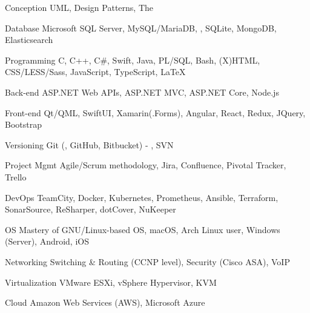 

\begin{cvskills}

  \cvskill
    {Conception} %
    {UML, Design Patterns, The } %

  \cvskill
    {Database} %
    {Microsoft SQL Server, MySQL/MariaDB, , SQLite, MongoDB, Elasticsearch} %

  \cvskill
    {Programming} %
    {C, C++, C\#, Swift, Java, PL/SQL, Bash, (X)HTML, CSS/LESS/Sass, JavaScript, TypeScript, \LaTeX} %

  \cvskill
    {Back-end} %
    {ASP.NET Web APIs, ASP.NET MVC, ASP.NET Core, Node.js} %

  \cvskill
    {Front-end} %
    {Qt/QML, SwiftUI, Xamarin(.Forms), Angular, React, Redux, JQuery, Bootstrap} %

  \cvskill
    {Versioning} %
    {Git (, GitHub, Bitbucket) - , SVN} %

  \cvskill
    {Project Mgmt} %
    {Agile/Scrum methodology, Jira, Confluence, Pivotal Tracker, Trello} %

  \cvskill
    {DevOps} %
    {TeamCity, Docker, Kubernetes, Prometheus, Ansible, Terraform, SonarSource, ReSharper, dotCover, NuKeeper} %

  \cvskill
    {OS} %
    {Mastery of GNU/Linux-based OS, macOS, Arch Linux user, Windows (Server), Android, iOS} %

  \cvskill
    {Networking} %
    {Switching \& Routing (CCNP level), Security (Cisco ASA), VoIP} %

  \cvskill
    {Virtualization} %
    {VMware ESXi, vSphere Hypervisor, KVM} %

  \cvskill
    {Cloud} %
    {Amazon Web Services (AWS), Microsoft Azure} %


\end{cvskills}


